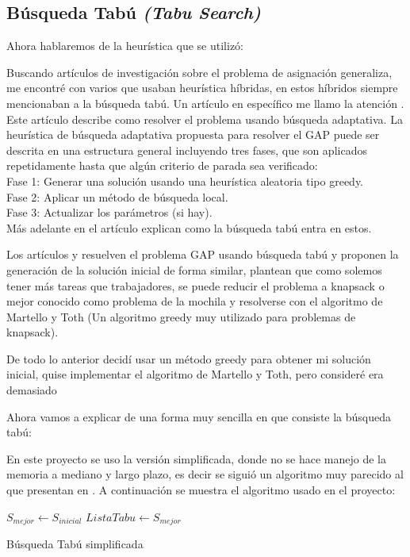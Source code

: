 \documentclass{article}
\begin{document}
\subsection{Búsqueda Tabú \emph{(Tabu Search)}}
Ahora hablaremos de la heurística que se utilizó:

Buscando artículos de investigación sobre el problema de asignación generaliza, me encontré con varios que usaban heurística híbridas, en estos híbridos siempre mencionaban a la búsqueda tabú. Un artículo en específico me llamo la atención \cite{gap}. Este artículo describe como resolver el problema usando búsqueda adaptativa. La heurística de búsqueda adaptativa propuesta para resolver el GAP puede ser descrita en una estructura general incluyendo tres fases, que son aplicados repetidamente hasta que algún criterio de parada sea verificado:\\
Fase 1: Generar una solución usando una heurística aleatoria tipo greedy.\\
Fase 2: Aplicar un método de búsqueda local.\\
Fase 3: Actualizar los parámetros (si hay).\\
Más adelante en el artículo explican como la búsqueda tabú entra en estos.

Los artículos \cite{tsgap} y \cite{tshgap} resuelven el problema GAP usando búsqueda tabú y proponen la generación de la solución inicial de forma similar, plantean que como solemos tener más tareas que trabajadores, se puede reducir el problema a knapsack o mejor conocido como problema de la mochila y resolverse con el algoritmo de Martello y Toth (Un algoritmo greedy muy utilizado para problemas de knapsack). 

De todo lo anterior decidí usar un método greedy para obtener mi solución inicial, quise implementar el algoritmo de Martello y Toth, pero consideré era demasiado 

Ahora vamos a explicar de una forma muy sencilla en que consiste la búsqueda tabú:



En este proyecto se uso la versión simplificada, donde no se hace manejo de la memoria a mediano y largo plazo, es decir se siguió un algoritmo muy parecido al que presentan en \cite{clever}. A continuación se muestra el algoritmo usado en el proyecto:

\begin{algorithm}[H]
	\SetAlgoLined
	$S_{mejor} \leftarrow S_{inicial}$
	$ListaTabu \leftarrow S_{mejor}$
	\caption{Búsqueda Tabú simplificada}
\end{algorithm}
\end{document}
